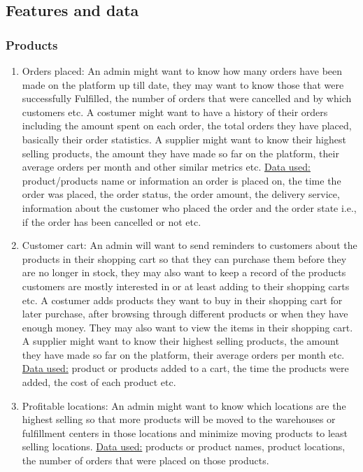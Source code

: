 \documentclass{article}
\begin{document}
\subsection{Features and data}
\subsubsection{Products}
\begin{enumerate}
  \item Orders placed: An admin might want to know how many orders have been made on the platform up till date, they may want to know those that were successfully Fulfilled, the number of orders that were cancelled and by which customers etc. A costumer might want to have a history of their orders including the amount spent on each order, the total orders they have placed, basically their order statistics. A supplier might want to know their highest selling products, the amount they have made so far on the platform, their average orders per month and other similar metrics etc. \underline{Data used:} product/products name or information an order is placed on, the time the order was placed, the order status, the order amount, the delivery service, information about the customer who placed the order and the order state i.e., if the order has been cancelled or not etc.
  \item Customer cart: An admin will want to send reminders to customers about the products in their shopping cart so that they can purchase them before they are no longer in stock, they may also want to keep a record of the products customers are mostly interested in or at least adding to their shopping carts etc. A costumer adds products they want to buy in their shopping cart for later purchase, after browsing through different products or when they have enough money. They may also want to view the items in their shopping cart. A supplier might want to know their highest selling products, the amount they have made so far on the platform, their average orders per month etc. \underline{Data used:} product or products added to a cart, the time the products were added, the cost of each product etc.
  \item Profitable locations: An admin might want to know which locations are the highest selling so that more products will be moved to the warehouses or fulfillment centers in those locations and minimize moving products to least selling locations. \underline{Data used:} products or product names, product locations, the number of orders that were placed on those products.

\end{enumerate}
\end{document}
